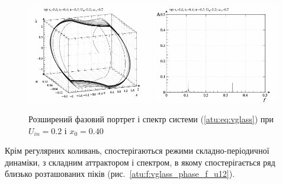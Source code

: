 \begin{figure}[ht!]
\begin{center}
  \includegraphics[width=0.49\textwidth]{p/cha/vg/vg_0-p_phe_0x20_0x70_0x40.png}
  \hfill
  \includegraphics[width=0.49\textwidth]{p/cha/vg/vg_fft-p_f_0x20_0x70_0x40.png}
\end{center}
\caption{Розширений фазовий портрет і спектр системи (\ref{atu:eq:vglass}) при $ U_{in} = 0.2 $ і $ x_0 = 0.40 $}
\label{atu:f:vglass_phase_f_u11}
\end{figure}

Крім регулярних коливань, спостерігаються режими
складно-періодичної динаміки, з складним аттрактором і
спектром, в якому спостерігається ряд близько розташованих
піків (рис.~\ref{atu:f:vglass_phase_f_u12}).

